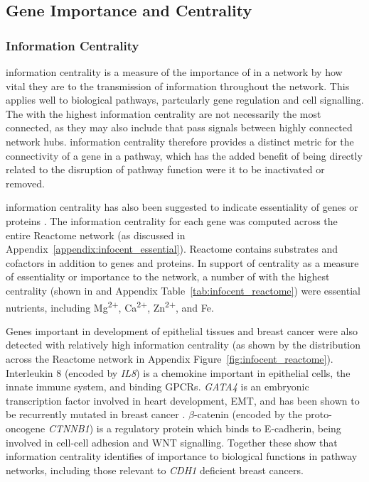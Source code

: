 \FloatBarrier

\subsection{Gene Importance and Centrality}  \label{chapt4:Network_Centrality}

\subsubsection{Information Centrality}  \label{chapt4:Network_InfoCent}

\Gls{information centrality} is a measure of the importance of  in a network by how vital they are to the transmission of information throughout the network. This applies well to biological pathways, partcularly gene regulation and cell signalling. The  with the highest \gls{information centrality} are not necessarily the most connected, as they may also include  that pass signals between highly connected network hubs. \Gls{information centrality} therefore provides a distinct metric for the connectivity of a gene in a pathway, which has the added benefit of being directly related to the disruption of pathway function were it to be inactivated or removed.

\Gls{information centrality} has also been suggested to indicate essentiality of genes or proteins \citep{Kranthi2013}. The \gls{information centrality} for each gene was computed across the entire Reactome network (as discussed in Appendix~\ref{appendix:infocent_essential}). Reactome contains substrates and cofactors in addition to genes and proteins. In support of \gls{centrality} as a measure of essentiality or importance to the network, a number of  with the highest \gls{centrality} (shown in and Appendix Table~\ref{tab:infocent_reactome}) were \gls{essential} nutrients, including Mg\textsuperscript{2$+$}, Ca\textsuperscript{2$+$}, Zn\textsuperscript{2$+$}, and Fe.%

Genes important in development of epithelial tissues and breast cancer were also detected with relatively high \gls{information centrality} (as shown by the distribution across the Reactome network in Appendix Figure~\ref{fig:infocent_reactome}). Interleukin 8 (encoded by \textit{IL8}) is a chemokine important in epithelial cells, the innate immune system, and binding \glspl{GPCR}. \textit{GATA4} is an embryonic transcription factor involved in heart development, \gls{EMT}, and has been shown to be recurrently mutated in breast cancer \citep{TCGA2012}. $\beta$-catenin (encoded by the proto-oncogene \textit{CTNNB1}) is a regulatory protein which binds to \gls{E-cadherin}, being involved in cell-cell adhesion and \gls{WNT} signalling. Together these show that \gls{information centrality} identifies  of importance to biological functions in pathway networks, including those relevant to \textit{CDH1} deficient breast cancers. 

